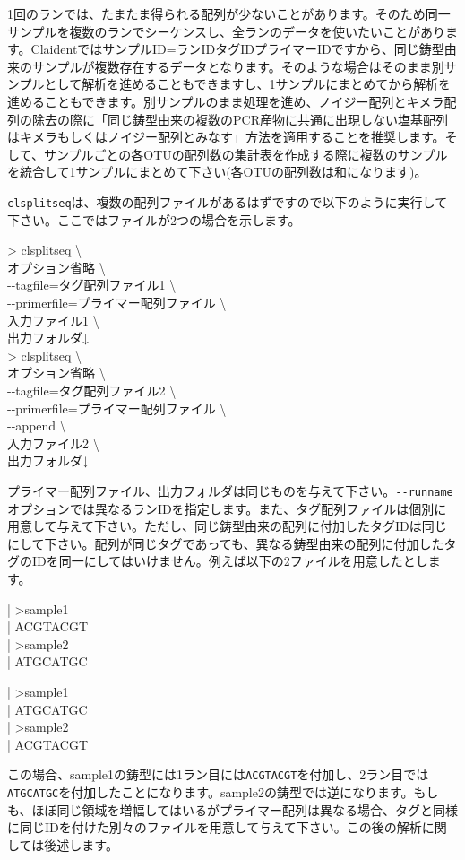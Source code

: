 \documentclass[titlepage,10pt,a4paper]{jsbook}
\newenvironment{content}{\begin{shaded}\vspace{-1em}\raggedright\ttfamily\footnotesize\setlength{\baselineskip}{1.4em}}{\end{shaded}\vspace{-1em}}
\newenvironment{cmd}{\begin{oframed}\raggedright\ttfamily\footnotesize\setlength{\baselineskip}{1.4em}}{\end{oframed}\vspace{-1em}}
\begin{document}
1回のランでは、たまたま得られる配列が少ないことがあります。そのため同一サンプルを複数のランでシーケンスし、全ランのデータを使いたいことがあります。ClaidentではサンプルID=ランID{\textunderscore}{\textunderscore}タグID{\textunderscore}{\textunderscore}プライマーIDですから、同じ鋳型由来のサンプルが複数存在するデータとなります。そのような場合はそのまま別サンプルとして解析を進めることもできますし、1サンプルにまとめてから解析を進めることもできます。別サンプルのまま処理を進め、ノイジー配列とキメラ配列の除去の際に「同じ鋳型由来の複数のPCR産物に共通に出現しない塩基配列はキメラもしくはノイジー配列とみなす」方法を適用することを推奨します。そして、サンプルごとの各OTUの配列数の集計表を作成する際に複数のサンプルを統合して1サンプルにまとめて下さい(各OTUの配列数は和になります)。

\texttt{clsplitseq}は、複数の配列ファイルがあるはずですので以下のように実行して下さい。ここではファイルが2つの場合を示します。
\begin{cmd}
{\textgreater} clsplitseq {\textbackslash}\\
オプション省略 {\textbackslash}\\
{-}{-}tagfile=タグ配列ファイル1 {\textbackslash}\\
{-}{-}primerfile=プライマー配列ファイル {\textbackslash}\\
入力ファイル1 {\textbackslash}\\
出力フォルダ↓\\
{\textgreater} clsplitseq {\textbackslash}\\
オプション省略 {\textbackslash}\\
{-}{-}tagfile=タグ配列ファイル2 {\textbackslash}\\
{-}{-}primerfile=プライマー配列ファイル {\textbackslash}\\
{-}{-}append {\textbackslash}\\
入力ファイル2 {\textbackslash}\\
出力フォルダ↓
\end{cmd}
プライマー配列ファイル、出力フォルダは同じものを与えて下さい。\texttt{{-}{-}runname}オプションでは異なるランIDを指定します。また、タグ配列ファイルは個別に用意して与えて下さい。ただし、同じ鋳型由来の配列に付加したタグIDは同じにして下さい。配列が同じタグであっても、異なる鋳型由来の配列に付加したタグのIDを同一にしてはいけません。例えば以下の2ファイルを用意したとします。
\begin{content}
| {\textgreater}sample1\\
| ACGTACGT\\
| {\textgreater}sample2\\
| ATGCATGC
\end{content}
\begin{content}
| {\textgreater}sample1\\
| ATGCATGC\\
| {\textgreater}sample2\\
| ACGTACGT
\end{content}
この場合、sample1の鋳型には1ラン目には\texttt{ACGTACGT}を付加し、2ラン目では\texttt{ATGCATGC}を付加したことになります。sample2の鋳型では逆になります。もしも、ほぼ同じ領域を増幅してはいるがプライマー配列は異なる場合、タグと同様に同じIDを付けた別々のファイルを用意して与えて下さい。この後の解析に関しては後述します。
\end{document}
